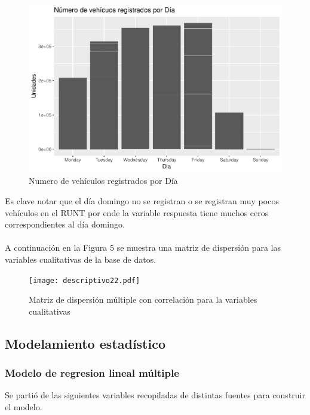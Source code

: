 \documentclass[11pt,twoside]{article}
\begin{document}
\begin{figure}[H]
    \centering
	\includegraphics{pordia.pdf}
	\caption{Numero de vehículos registrados por Día}
\end{figure}
\noindent
\noindent
Es clave notar que el día domingo no se registran o se registran muy pocos vehículos en el RUNT por ende la variable respuesta tiene muchos ceros correspondientes al día domingo.
\\
\\
\noindent A continuación en la Figura 5 se muestra una matriz de dispersión para las variables cualitativas de la base de datos.
\begin{figure}[H]
   	\centering
	\texttt{[image: descriptivo22.pdf]}
	\caption{Matriz de dispersión múltiple con correlación para la variables cualitativas}
\end{figure}





\subsection{Modelamiento estadístico}
\subsubsection{Modelo de regresion lineal múltiple}
\noindent Se partió de las siguientes variables recopiladas de distintas fuentes para construir el modelo.
\end{document}
